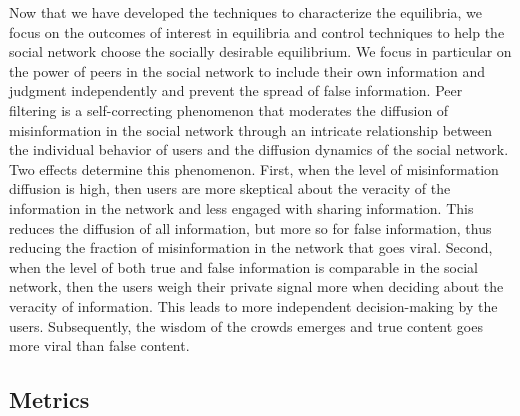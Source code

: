 Now that we have developed the techniques to characterize the equilibria, we focus on the outcomes of interest in equilibria and control techniques to help the social network choose the socially desirable equilibrium. We focus in particular on the power of peers in the social network to include their own information and judgment independently and prevent the spread of false information. Peer filtering is a self-correcting phenomenon that moderates the diffusion of misinformation in the social network through an intricate relationship between the individual behavior of users and the diffusion dynamics of the social network.  Two effects determine this phenomenon. First, when the level of misinformation diffusion is high, then users are more skeptical about the veracity of the information in the network and less engaged with sharing information. This reduces the diffusion of all information, but more so for false information, thus reducing the fraction of misinformation in the network that goes viral. Second, when the level of both true and false information is comparable in the social network, then the users weigh their private signal more when deciding about the veracity of information. This leads to more independent decision-making by the users. Subsequently, the wisdom of the crowds emerges and true content goes more viral than false content. 





\subsection{Metrics}

